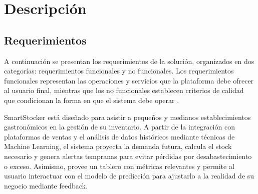 \chapter{Descripción}\label{chapter04}

\section{Requerimientos}\label{sec:requerimientos}
A continuación se presentan los requerimientos de la solución, organizados en dos categorías: requerimientos funcionales y no funcionales. Los requerimientos funcionales representan las operaciones y servicios que la plataforma debe ofrecer al usuario final, mientras que los no funcionales establecen criterios de calidad que condicionan la forma en que el sistema debe operar \parencite{ieee2008}.

SmartStocker está diseñado para asistir a pequeños y medianos establecimientos gastronómicos en la gestión de su inventario. A partir de la integración con plataformas de ventas y el análisis de datos históricos mediante técnicas de Machine Learning, el sistema proyecta la demanda futura, calcula el stock necesario y genera alertas tempranas para evitar pérdidas por desabastecimiento o exceso. Asimismo, provee un tablero con métricas relevantes y permite al usuario interactuar con el modelo de predicción para ajustarlo a la realidad de su negocio mediante feedback.

